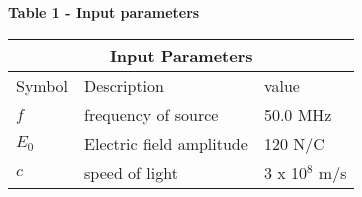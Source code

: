 \setlength{\arrayrulewidth}{0.3mm}
\setlength{\tabcolsep}{18pt}
\renewcommand{\arraystretch}{1.5}

\textbf{Table 1 - Input parameters}\\

\begin{tabular}{ |p{1cm}|p{1cm}|p{1.7cm}|  }
\hline
\multicolumn{3}{|c|}{Input Parameters} \\
\hline
Symbol& Description&value\\
\hline
$f$ & frequency of source & 50.0 MHz\\
\hline
$E_0$ & Electric field amplitude  & 120 N/C\\
\hline
$c$ &speed of light & 3 x 10$^8$ m/s \\
\hline
\end{tabular}
    